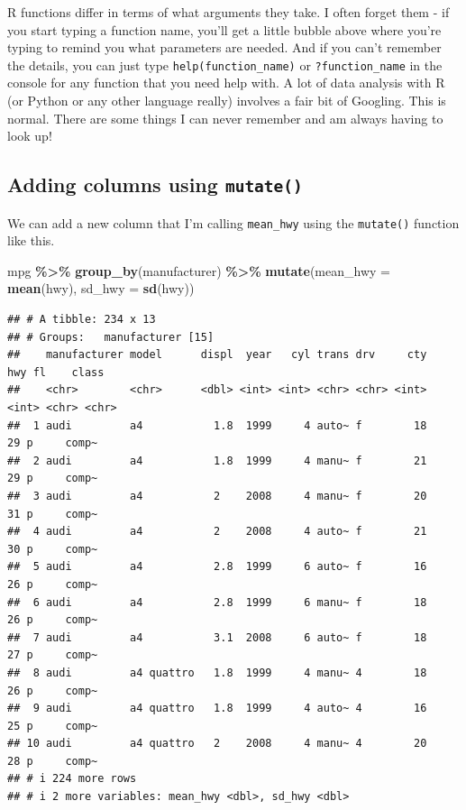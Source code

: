 \documentclass[
]{book}
\newenvironment{Shaded}{\begin{snugshade}}{\end{snugshade}}
\newcommand{\AttributeTok}[1]{\textcolor[rgb]{0.13,0.29,0.53}{#1}}
\newcommand{\FunctionTok}[1]{\textcolor[rgb]{0.13,0.29,0.53}{\textbf{#1}}}
\newcommand{\NormalTok}[1]{#1}
\newcommand{\SpecialCharTok}[1]{\textcolor[rgb]{0.81,0.36,0.00}{\textbf{#1}}}
\begin{document}
R functions differ in terms of what arguments they take. I often forget them - if you start typing a function name, you'll get a little bubble above where you're typing to remind you what parameters are needed. And if you can't remember the details, you can just type \texttt{help(function\_name)} or \texttt{?function\_name} in the console for any function that you need help with. A lot of data analysis with R (or Python or any other language really) involves a fair bit of Googling. This is normal. There are some things I can never remember and am always having to look up!

\hypertarget{adding-columns-using-mutate}{%
\subsection{\texorpdfstring{Adding columns using \texttt{mutate()}}{Adding columns using mutate()}}\label{adding-columns-using-mutate}}

We can add a new column that I'm calling \texttt{mean\_hwy} using the \texttt{mutate()} function like this.

\begin{Shaded}
\begin{Highlighting}[]
\NormalTok{mpg }\SpecialCharTok{\%\textgreater{}\%} 
  \FunctionTok{group\_by}\NormalTok{(manufacturer) }\SpecialCharTok{\%\textgreater{}\%}
  \FunctionTok{mutate}\NormalTok{(}\AttributeTok{mean\_hwy =} \FunctionTok{mean}\NormalTok{(hwy), }\AttributeTok{sd\_hwy =} \FunctionTok{sd}\NormalTok{(hwy))}
\end{Highlighting}
\end{Shaded}

\begin{verbatim}
## # A tibble: 234 x 13
## # Groups:   manufacturer [15]
##    manufacturer model      displ  year   cyl trans drv     cty   hwy fl    class
##    <chr>        <chr>      <dbl> <int> <int> <chr> <chr> <int> <int> <chr> <chr>
##  1 audi         a4           1.8  1999     4 auto~ f        18    29 p     comp~
##  2 audi         a4           1.8  1999     4 manu~ f        21    29 p     comp~
##  3 audi         a4           2    2008     4 manu~ f        20    31 p     comp~
##  4 audi         a4           2    2008     4 auto~ f        21    30 p     comp~
##  5 audi         a4           2.8  1999     6 auto~ f        16    26 p     comp~
##  6 audi         a4           2.8  1999     6 manu~ f        18    26 p     comp~
##  7 audi         a4           3.1  2008     6 auto~ f        18    27 p     comp~
##  8 audi         a4 quattro   1.8  1999     4 manu~ 4        18    26 p     comp~
##  9 audi         a4 quattro   1.8  1999     4 auto~ 4        16    25 p     comp~
## 10 audi         a4 quattro   2    2008     4 manu~ 4        20    28 p     comp~
## # i 224 more rows
## # i 2 more variables: mean_hwy <dbl>, sd_hwy <dbl>
\end{verbatim}
\end{document}

